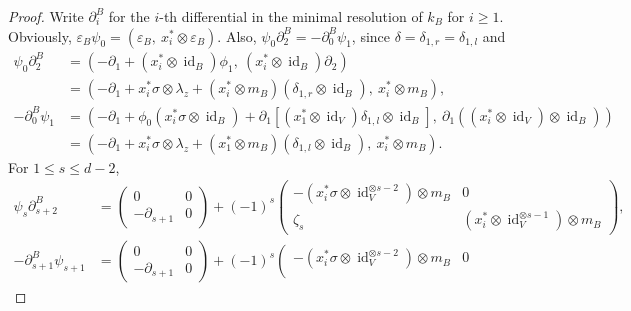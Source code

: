 \documentclass[a4paper,10pt]{amsart}
\theoremstyle{definition}
\numberwithin{equation}{section}
\DeclareMathOperator{\id}{id}
\begin{document}
\begin{proof}
Write $\partial_i^B$ for the $i$-th differential in the minimal resolution of $k_B$ for $i\geq 1$. Obviously, $\varepsilon_B\psi_0=(\varepsilon_B,\ x_i^*\otimes\varepsilon_B)$. Also, $\psi_0\partial^B_2=-\partial^B_0\psi_1$, since $\delta=\delta_{1,r}=\delta_{1,l}$ and
\begin{align*}
\psi_0\partial^B_2&=\left(-\partial_1+(x_i^*\otimes\id_B)\phi_1,\ (x_i^*\otimes\id_B)\partial_2      \right)\\
&=\left(-\partial_1+x_i^*\sigma\otimes\lambda_z+(x_i^*\otimes m_B)(\delta_{1,r}\otimes \id_B),\ x_i^*\otimes m_B    \right),\\
-\partial^B_0\psi_1&=\left(
-\partial_1+\phi_0(x^*_i\sigma\otimes\id_B)+\partial_1\left[(x_1^*\otimes\id_V)\delta_{1,l}\otimes\id_B\right],\ \partial_1((x_i^*\otimes\id_V)\otimes \id_B)
         \right)\\
&=\left(
-\partial_1+x^*_i\sigma\otimes\lambda_z+(x_1^*\otimes m_B)(\delta_{1,l}\otimes\id_B),\ x_i^*\otimes m_B\right).
\end{align*}
For $1\leq s\leq d-2$,
\begin{align*}
\psi_{s}\partial_{s+2}^B&=
\left(
\begin{array}{cc}
0 &  0\\
-\partial_{s+1}&0
\end{array}
\right)
+
(-1)^s
\left(
\begin{array}{cc}
-(x_i^*\sigma\otimes\id_V^{\otimes s-2})\otimes m_B &  0\\
  \zeta_s&  (x_i^*\otimes\id_V^{\otimes s-1})\otimes m_B
\end{array}
\right),\\
-\partial_{s+1}^B\psi_{s+1}&=\left(
\begin{array}{cc}
0 &  0\\
-\partial_{s+1}&0
\end{array}
\right)+
(-1)^{s}\left(
\begin{array}{cc}
-(x_i^*\sigma\otimes\id_V^{\otimes s-2})\otimes m_B &  0\\

\end{array}
\end{align*}
\end{proof}
\end{document}
